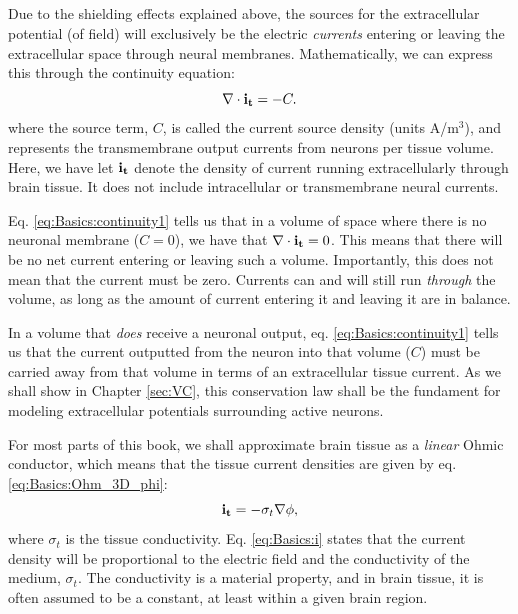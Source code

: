 \subsection{}
\label{sec:Basics:C} 
Due to the shielding effects explained above, the sources for the extracellular potential (of field) will exclusively be the electric \textit{currents} entering or leaving the extracellular space through neural membranes. Mathematically, we can express this through the continuity equation:
\begin{equation}
\nabla \cdot {\bf i_t} = -C.
\label{eq:Basics:continuity1}
\end{equation}
where the source term, $C$, is called the current source density (units A/m$^3$), and represents  the transmembrane output currents from neurons per tissue volume. Here, we have let ${\bf i_t}$ denote the density of current running extracellularly through brain tissue. It does not include intracellular or transmembrane neural currents. 

Eq. \ref{eq:Basics:continuity1} tells us that in a volume of space where there is no neuronal membrane ($C = 0$), we have that $\nabla \cdot {\bf i_t} = 0$. This means that there will be no net current entering or leaving such a volume. Importantly, this does not mean that the current must be zero. Currents can and will still run \textit{through} the volume, as long as the amount of current entering it and leaving it are in balance. 

In a volume that \textit{does} receive a neuronal output, eq. \ref{eq:Basics:continuity1} tells us that the current outputted from the neuron into that volume ($C$) must be carried away from that volume in terms of an extracellular tissue current. As we shall show in Chapter \ref{sec:VC}, this conservation law shall be the fundament for modeling extracellular potentials surrounding active neurons.

For most parts of this book, we shall approximate brain tissue as a \textit{linear} Ohmic conductor, which means that the tissue current densities are given by eq. \ref{eq:Basics:Ohm_3D_phi}:
\begin{equation}
{\bf i_t} = - \sigma_t \nabla \phi, 
\label{eq:Basics:i}
\end{equation}
where $\sigma_t$ is the tissue conductivity. Eq. \ref{eq:Basics:i} states that the current density will be proportional to the electric field and the conductivity of the medium, $\sigma_t$. The conductivity is a material property, and in brain tissue, it is often assumed to be a constant, at least within a given brain region. 


